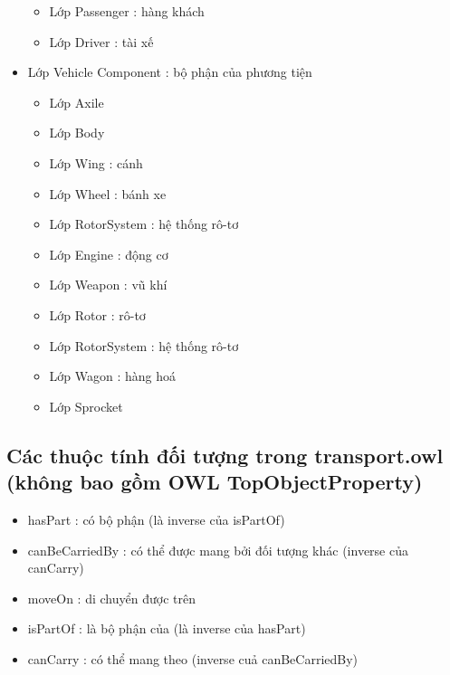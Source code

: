 \begin{itemize}
\begin{itemize}
	\item Lớp Passenger : hàng khách
	\item Lớp Driver : tài xế
	\end{itemize}
\item Lớp Vehicle Component : bộ phận của phương tiện
	\begin{itemize}
	\item Lớp Axile
	\item Lớp Body
	\item Lớp Wing : cánh
	\item Lớp Wheel : bánh xe
	\item Lớp RotorSystem : hệ thống rô-tơ
	\item Lớp Engine : động cơ
	\item Lớp Weapon : vũ khí
	\item Lớp Rotor : rô-tơ
	\item Lớp RotorSystem : hệ thống rô-tơ
	\item Lớp Wagon : hàng hoá
	\item Lớp Sprocket
	\end{itemize}
\end{itemize}
\subsection{Các thuộc tính đối tượng trong transport.owl (không bao gồm OWL TopObjectProperty)}
\begin{itemize}
\item hasPart : có bộ phận (là inverse của isPartOf)
\item canBeCarriedBy : có thể được mang bởi đối tượng khác (inverse của canCarry)
\item moveOn : di chuyển được trên
\item isPartOf : là bộ phận của (là inverse của hasPart)
\item canCarry : có thể mang theo (inverse cuả canBeCarriedBy)
\end{itemize}
